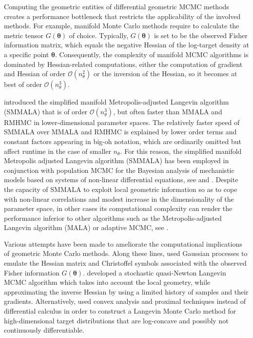 \documentclass[twoside,11pt]{article}
\begin{document}
Computing the geometric entities of differential geometric MCMC methods creates a performance bottleneck that restricts the 
applicability of the involved methods. For example, manifold Monte Carlo methods require to calculate the metric tensor
$G(\boldsymbol{\theta})$ of choice. Typically, $G(\boldsymbol{\theta})$ is set to be the observed Fisher information matrix,
which equals the negative Hessian of the log-target density at a specific point $\boldsymbol{\theta}$.
Consequently, the complexity of manifold MCMC algorithms is dominated by Hessian-related computations, either the 
computation of gradient and Hessian of order  $\mathcal{O}(n_\theta^2)$ or the inversion of the Hessian, so it becomes at 
best of order $\mathcal{O}(n_\theta^3)$.

\cite{gir_cal__rie} introduced the simplified manifold Metropolis-adjusted Langevin algorithm (SMMALA) that is of order 
$\mathcal{O}(n_\theta^3)$, but often faster than MMALA and RMHMC in lower-dimensional parameter spaces. The 
relatively faster speed of SMMALA over MMALA and RMHMC is explained by lower order terms and constant factors appearing in 
big-oh notation, which are ordinarily omitted but affect runtime in the case of smaller $n_\theta$. For this reason, the 
simplified manifold Metropolis adjusted Langevin algorithm (SMMALA) has been employed in conjunction with population MCMC 
for the Bayesian analysis of mechanistic models based on systems of non-linear differential equations, see 
\cite{cal_gir__sta} and \cite{sch_pap__ews}. Despite the capacity of SMMALA to exploit local geometric information so as to 
cope with non-linear correlations and modest increase in the dimensionality of the parameter space, in other cases its 
computational complexity can render the performance inferior to other algorithms such as the Metropolis-adjusted Langevin 
algorithm (MALA) or adaptive MCMC, see \cite{cal_eps_sil__bay}.

Various attempts have been made to ameliorate the computational implications of geometric Monte Carlo methods. Along these 
lines, \cite{lan_tha_chr__emu} used Gaussian processes to emulate the Hessian matrix and Christoffel symbols associated with 
the observed Fisher information $G(\boldsymbol{\theta})$. \cite{sim_bad_cem__sto} developed a stochastic quasi-Newton 
Langevin MCMC algorithm which takes into account the local geometry, while approximating the inverse Hessian by using a 
limited history of samples and their gradients. Alternatively, \cite{per__prox} used convex analysis and proximal techniques 
instead of differential calculus in order to construct a Langevin Monte Carlo method for high-dimensional target 
distributions that are log-concave and possibly not continuously differentiable.
\end{document}
